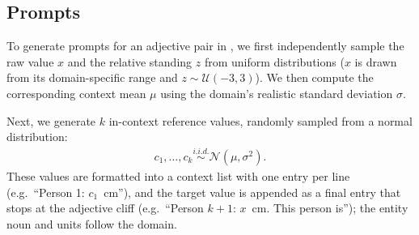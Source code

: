 \documentclass{article}
\begin{document}
\begin{table}[t]
  \centering
  \footnotesize
  \setlength{\tabcolsep}{3pt}
  \caption{\textbf{Adjective-pair prompt domains.}
  The dense prompt grid samples target values $x$ over the listed ranges, in the listed units, and uses the shown context spread $\sigma$.
  Income is used as the measured proxy for wealth; its normalization is log-space, so $\sigma=\log 2$ means one unit of normalized spread corresponds to doubling or halving annual income.}
  \label{tab:domains}
\end{table}

\subsection{Prompts}
\label{subsec:prompts}
To generate prompts for an adjective pair in , we first independently sample the raw value $x$ and the relative standing $z$ from uniform distributions ($x$ is drawn from its domain-specific range and $z \sim \mathcal{U}(-3, 3)$). We then compute the corresponding context mean $\mu$ using the domain's realistic standard deviation $\sigma$.

Next, we generate $k$ in-context reference values, randomly sampled from a normal distribution:
\begin{align*}
    c_1,\ldots,c_k \overset{i.i.d.}{\sim} \mathcal{N}(\mu,\sigma^2).
\end{align*}
These values are formatted into a context list with one entry per line (e.g.\ ``Person 1: $c_1$~cm''), and the target value is appended as a final entry that stops at the adjective cliff (e.g.\ ``Person $k{+}1$: $x$~cm. This person is''); the entity noun and units follow the domain.
\end{document}
